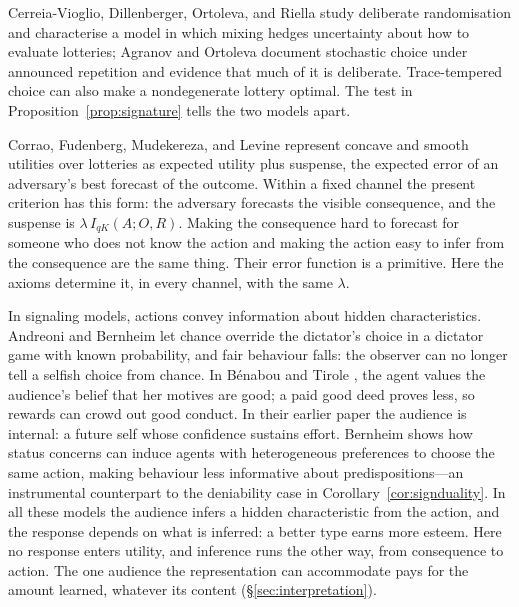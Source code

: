 \documentclass[11pt,a4paper]{article}
\theoremstyle{definition}
\newcommand{\I}{I}
\newcommand{\1}{\mathbf 1}
\begin{document}
Cerreia-Vioglio, Dillenberger, Ortoleva, and Riella
\cite{CerreiaVioglioDillenbergerOrtolevaRiella2019} study deliberate randomisation and characterise a model in
which mixing hedges uncertainty about how to evaluate lotteries; Agranov and Ortoleva
\cite{AgranovOrtoleva2017} document stochastic choice under announced repetition and evidence that much of it is
deliberate.  Trace-tempered choice can also make a nondegenerate lottery optimal. The test in Proposition~\ref{prop:signature} tells the two models apart.

Corrao, Fudenberg, Mudekereza, and Levine \cite{CorraoFudenbergMudekerezaLevine2026} represent
concave and smooth utilities over lotteries as expected utility plus suspense, the expected error of an
adversary's best forecast of the outcome.  Within a fixed channel the present criterion has this form: the
adversary forecasts the visible consequence, and the suspense is $\lambda\,\I_{qK}(A;O,R)$.  Making the
consequence hard to forecast for someone who does not know the action and making the action easy to infer from
the consequence are the same thing.  Their error function is a primitive.  Here the axioms determine it, in every channel, with the same $\lambda$.

In signaling models, actions convey information about hidden characteristics.  Andreoni and Bernheim
\cite{AndreoniBernheim2009} let chance override the dictator's choice in a dictator game with known probability, and fair behaviour
falls: the observer can no longer tell a selfish choice from chance.  In B\'enabou and Tirole
\cite{BenabouTirole2006}, the agent values the audience's belief that her motives are good; a paid good deed
proves less, so rewards can crowd out good conduct.  In their earlier paper \cite{BenabouTirole2002} the
audience is internal: a future self whose confidence sustains effort.  Bernheim \cite{Bernheim1994} shows how
status concerns can induce agents with heterogeneous preferences to choose the same action, making behaviour less
informative about predispositions---an instrumental counterpart to the deniability case in
Corollary~\ref{cor:signduality}.  In all these models the audience infers a hidden characteristic from the
action, and the response depends on what is inferred: a better type earns more esteem.  Here no response enters
utility, and inference runs the other way, from consequence to action.  The one audience the representation can
accommodate pays for the amount learned, whatever its content (\S\ref{sec:interpretation}).
\end{document}
